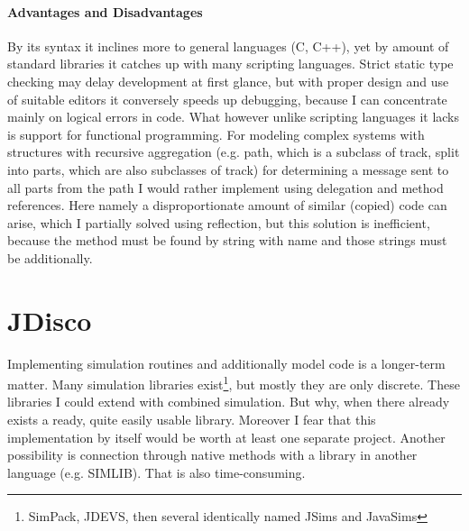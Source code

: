 \documentclass[english]{cls/fitthesis}
\begin{document}
    \paragraph{Advantages and Disadvantages}\label{java:col}
    By its syntax it inclines more to general languages (C, C++), yet by amount of standard libraries it catches up with many scripting languages.
    Strict static type checking may delay development at first glance,
    but with proper design and use of suitable editors it conversely speeds up debugging, because I can
    concentrate mainly on logical errors in code.
    What however unlike scripting languages it lacks is support for functional programming.
    For modeling complex systems with structures with recursive aggregation
    (e.g. path, which is a subclass of track, split into parts, which are also subclasses of track)
    for determining a message sent to all parts from the path I would rather implement using delegation and method references.
    Here namely a disproportionate amount of similar (copied) code can arise, which I partially
    solved using reflection, but this solution is inefficient, because the method must be found by string with name and those strings must be  additionally.
  \section{JDisco}
  Implementing simulation routines and additionally model code is a longer-term matter.
  Many simulation libraries exist\footnote{SimPack, JDEVS, then several identically named JSims and JavaSims},
  but mostly they are only discrete. These libraries I could extend with combined simulation.
  But why, when there already exists a ready, quite easily usable
  library. Moreover I fear that this implementation by itself would be worth at least one separate
  project. Another possibility is connection through native methods
  with a library in another language (e.g. SIMLIB). That is also time-consuming.
\end{document}

